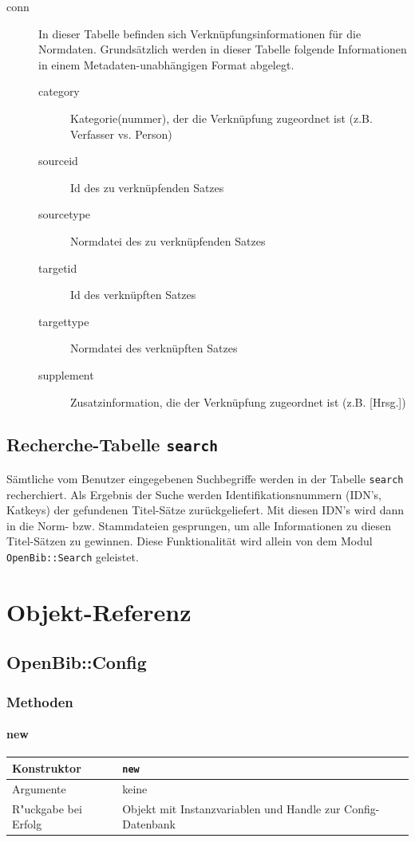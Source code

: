 \documentclass[11pt, twoside, a4paper, BCOR8mm, DIV12, bibtotoc,idxtotoc]{scrbook}
\begin{document}
\begin{description}
\item[conn] In dieser Tabelle befinden sich
  Verknüpfungsinformationen für die Normdaten. 
  Grundsätzlich werden in dieser Tabelle folgende Informationen in
  einem Metadaten-unabhängigen Format abgelegt.
  \begin{description}
  \item[category] Kategorie(nummer), der die Verknüpfung zugeordnet
    ist (z.B. Verfasser vs. Person)
  \item[sourceid] Id des zu verknüpfenden Satzes
  \item[sourcetype] Normdatei des zu verknüpfenden Satzes
  \item[targetid] Id des verknüpften Satzes
  \item[targettype] Normdatei des verknüpften Satzes
  \item[supplement] Zusatzinformation, die der Verknüpfung zugeordnet
    ist (z.B. [Hrsg.])
  \end{description}
\end{description}


\section{Recherche-Tabelle \texttt{search}}

Sämtliche vom Benutzer eingegebenen Suchbegriffe werden in der Tabelle
\texttt{search} recherchiert. Als Ergebnis der Suche werden
Identifikationsnummern (IDN's, Katkeys) der gefundenen Titel-Sätze
zurückgeliefert. Mit diesen IDN's wird dann in die Norm- bzw.
Stammdateien gesprungen, um alle Informationen zu diesen Titel-Sätzen
zu gewinnen. Diese Funktionalität wird allein von dem Modul
\texttt{OpenBib::Search} geleistet.


\chapter{Objekt-Referenz}


\section{OpenBib::Config}


\subsection{Methoden}

\subsubsection{new}
\begin{shadowenv}
\begin{tabular}{lp{10cm}}
  Konstruktor & \texttt{new}\\
  \hline
  Argumente     & keine\\
  R"uckgabe bei Erfolg & Objekt mit Instanzvariablen und
  Handle zur Config-Datenbank\\
\end{tabular}
\end{shadowenv}
\end{document}
